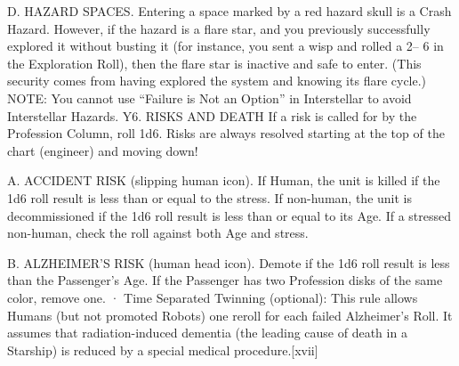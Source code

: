 \documentclass[a4paper]{book}
\begin{document}
D. HAZARD SPACES. Entering a space marked by a red hazard skull is a Crash Hazard. However, if the hazard is a flare star, and you previously successfully explored it without busting it (for instance, you sent a wisp and rolled a 2– 6 in the Exploration Roll), then the flare star is inactive and safe to enter. (This security comes from having explored the system and knowing its flare cycle.)
NOTE: You cannot use “Failure is Not an Option” in Interstellar to avoid Interstellar Hazards.
Y6. RISKS AND DEATH
If a risk is called for by the Profession Column, roll 1d6. Risks are always resolved starting at the top of the chart (engineer) and moving down!
 
A. ACCIDENT RISK (slipping human icon). If Human, the unit is killed if the 1d6 roll result is less than or equal to the stress. If non-human, the unit is decommissioned if the 1d6 roll result is less than or equal to its Age. If a stressed non-human, check the roll against both Age and stress.
 
B. ALZHEIMER’S RISK (human head icon). Demote if the 1d6 roll result is less than the Passenger’s Age. If the Passenger has two Profession disks of the same color, remove one.
·       Time Separated Twinning (optional): This rule allows Humans (but not promoted Robots) one reroll for each failed Alzheimer’s Roll. It assumes that radiation-induced dementia (the leading cause of death in a Starship) is reduced by a special medical procedure.[xvii]
 
\end{document}

